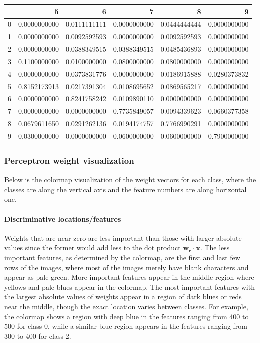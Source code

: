 \begin{tabular}{l|r|r|r|r|r}
 & 5 & 6 & 7 & 8 & 9 \\
\hline
0 & 0.0000000000 & 0.0111111111 & 0.0000000000 & 0.0444444444 & 0.0000000000 \\
1 & 0.0000000000 & 0.0092592593 & 0.0000000000 & 0.0092592593 & 0.0000000000 \\
2 & 0.0000000000 & 0.0388349515 & 0.0388349515 & 0.0485436893 & 0.0000000000 \\
3 & 0.1100000000 & 0.0100000000 & 0.0800000000 & 0.0800000000 & 0.0000000000 \\
4 & 0.0000000000 & 0.0373831776 & 0.0000000000 & 0.0186915888 & 0.0280373832 \\
5 & 0.8152173913 & 0.0217391304 & 0.0108695652 & 0.0869565217 & 0.0000000000 \\
6 & 0.0000000000 & 0.8241758242 & 0.0109890110 & 0.0000000000 & 0.0000000000 \\
7 & 0.0000000000 & 0.0000000000 & 0.7735849057 & 0.0094339623 & 0.0660377358 \\
8 & 0.0679611650 & 0.0291262136 & 0.0194174757 & 0.7766990291 & 0.0000000000 \\
9 & 0.0300000000 & 0.0000000000 & 0.0600000000 & 0.0600000000 & 0.7900000000 
\end{tabular}

\subsubsection{Perceptron weight visualization}
Below is the colormap visualization of the weight vectors for each class, where the classes are along the vertical axis and the feature numbers are along horizontal one.

\paragraph{Discriminative locations/features} Weights that are near zero are less important than those with larger absolute values since the former would add less to the dot product $\mathbf{w_c} \cdot \mathbf{x}$. The less important features, as determined by the colormap, are the first and last few rows of the images, where most of the images merely have blank characters and appear as pale green. More important features appear in the middle region where yellows and pale blues appear in the colormap. The most important features with the largest absolute values of weights appear in a region of dark blues or reds near the middle, though the exact location varies between classes. For example, the colormap shows a region with deep blue in the features ranging from 400 to 500 for class 0, while a similar blue region appears in the features ranging from 300 to 400 for class 2.


